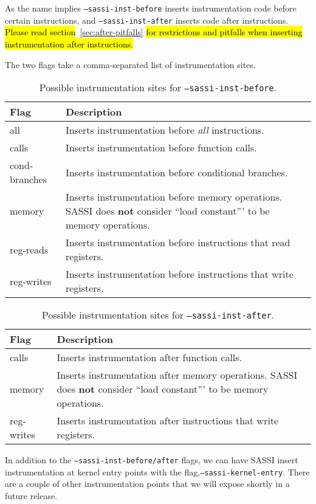 As the name implies \texttt{--sassi-inst-before} inserts
instrumentation code before certain instructions, and
\texttt{--sassi-inst-after} inserts code after
instructions. {\hl{Please read section}~\ref{sec:after-pitfalls} \hl{for restrictions and pitfalls when inserting instrumentation after instructions.}}

The two
flags take a comma-separated list of instrumentation sites.

\begin{table}[h]
\centering
\begin{tabular}{|l|l|}
\hline
Flag & Description \\
\hline
all & Inserts instrumentation before \emph{all} instructions. \\
calls & Inserts instrumentation before function calls. \\
cond-branches & Inserts instrumentation before conditional branches. \\
memory & Inserts instrumentation before memory operations.  SASSI does {\bf not} consider ``load constant''' to be memory operations. \\
reg-reads & Inserts instrumentation before instructions that read
registers. \\
reg-writes & Inserts instrumentation before instructions that write
registers. \\
\hline
\end{tabular}
\caption{Possible instrumentation sites for \texttt{--sassi-inst-before}.}
\label{tab:inst-before}
\end{table}

\begin{table}[h]
\centering
\begin{tabular}{|l|l|}
\hline
Flag & Description \\
\hline
calls & Inserts instrumentation after function calls. \\
memory & Inserts instrumentation after memory operations. SASSI does {\bf not} consider ``load constant''' to be memory operations. \\
reg-writes & Inserts instrumentation after instructions that write
registers. \\
\hline
\end{tabular}
\caption{Possible instrumentation sites for \texttt{--sassi-inst-after}.}
\label{tab:inst-after}
\end{table}

In addition to the \texttt{--sassi-inst-before/after} flags, we can
have SASSI insert instrumentation at kernel entry points with the
flag,\texttt{--sassi-kernel-entry}.  There are a couple of other
instrumentation points that we will expose shortly in a future release.

